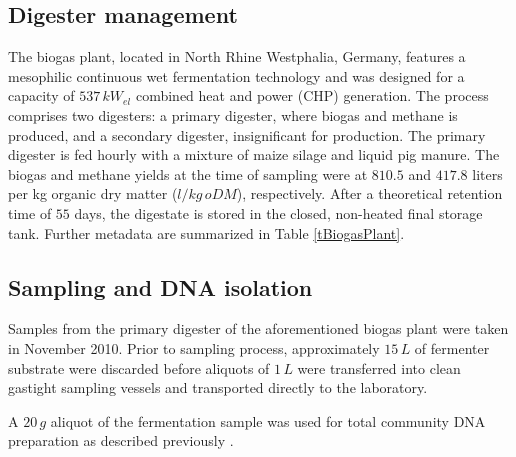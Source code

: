 \documentclass{bmcart}
\begin{document}
\subsection*{Digester management}
The biogas plant, located in North Rhine Westphalia, Germany, features a mesophilic continuous wet fermentation technology and was designed for a capacity of $537\,kW_{el}$ combined heat and power (CHP) generation.
The process comprises two digesters: a primary digester, where biogas and methane is produced, and a secondary digester, insignificant for production.
The primary digester is fed hourly with a mixture of maize silage and liquid pig manure.
The biogas and methane yields at the time of sampling were at $810.5$ and $417.8$ liters per kg organic dry matter ($l / kg\,oDM$), respectively.
After a theoretical retention time of $55$ days, the digestate is stored in the closed, non-heated final storage tank.
Further metadata are summarized in Table \ref{tBiogasPlant}.
%
\subsection*{Sampling and DNA isolation}
Samples from the primary digester of the aforementioned biogas plant were taken in November 2010.
Prior to sampling process, approximately $15\,L$ of fermenter substrate were discarded before aliquots of $1\,L$ were transferred into clean gastight sampling vessels and transported directly to the laboratory.

A $20\,g$ aliquot of the fermentation sample was used for total community DNA preparation as described previously \cite{Schlueter2008}.
%
\end{document}
